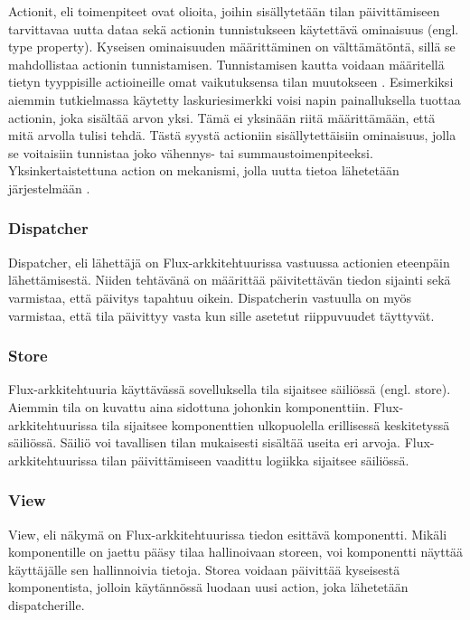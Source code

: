 Actionit, eli toimenpiteet ovat olioita, joihin sisällytetään tilan päivittämiseen tarvittavaa uutta dataa sekä actionin tunnistukseen käytettävä ominaisuus (engl. type property). Kyseisen ominaisuuden määrittäminen on välttämätöntä, sillä se mahdollistaa actionin tunnistamisen. Tunnistamisen kautta voidaan määritellä tietyn tyyppisille actioineille omat vaikutuksensa tilan muutokseen \cite{facebookflux}. Esimerkiksi aiemmin tutkielmassa käytetty laskuriesimerkki voisi napin painalluksella tuottaa actionin, joka sisältää arvon yksi. Tämä ei yksinään riitä määrittämään, että mitä arvolla tulisi tehdä. Tästä syystä actioniin sisällytettäisiin ominaisuus, jolla se voitaisiin tunnistaa joko vähennys- tai summaustoimenpiteeksi. Yksinkertaistettuna action on mekanismi, jolla uutta tietoa lähetetään järjestelmään \cite[12]{flux}.


\subsubsection{Dispatcher}
\label{Dispatcher}

Dispatcher, eli lähettäjä on Flux-arkkitehtuurissa vastuussa actionien eteenpäin lähettämisestä. Niiden tehtävänä on määrittää päivitettävän tiedon sijainti sekä varmistaa, että päivitys tapahtuu oikein. Dispatcherin vastuulla on myös varmistaa, että tila päivittyy vasta kun sille asetetut riippuvuudet täyttyvät. \cite[13]{flux}


\subsubsection{Store}
\label{Store}

Flux-arkkitehtuuria käyttävässä sovelluksella tila sijaitsee säiliössä (engl. store). Aiemmin tila on kuvattu aina sidottuna johonkin komponenttiin. Flux-arkkitehtuurissa tila sijaitsee komponenttien ulkopuolella erillisessä keskitetyssä säiliössä. Säiliö voi tavallisen tilan mukaisesti sisältää useita eri arvoja. Flux-arkkitehtuurissa tilan päivittämiseen vaadittu logiikka sijaitsee säiliössä. \cite[14]{flux}


\subsubsection{View}
\label{View}

View, eli näkymä on Flux-arkkitehtuurissa tiedon esittävä komponentti. Mikäli komponentille on jaettu pääsy tilaa hallinoivaan storeen, voi komponentti näyttää käyttäjälle sen hallinnoivia tietoja. Storea voidaan päivittää kyseisestä komponentista, jolloin käytännössä luodaan uusi action, joka lähetetään dispatcherille. \cite[15]{flux}

